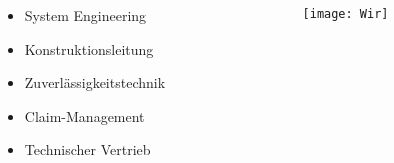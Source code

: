 \documentclass[slidestop,compress,mathserif, aspectratio = 169]{beamer}
\begin{document}
{\begin{columns}[t]
\begin{column}[T]{7cm}
\begin{itemize}
{\begin{itemize}
\begin{itemize}
		\item System Engineering
		\item Konstruktionsleitung
		\item Zuverl\"assigkeitstechnik
		\item Claim-Management
		\item Technischer Vertrieb
		\end{itemize}
		\end{itemize}}
     	\end{itemize}
     \end{column}
     	\begin{column}[T]{7cm} 
         	\begin{center}
			\vspace{-.7cm}
            		\texttt{[image: Wir]}\source{}
        		\end{center}
     \end{column}
 \end{columns}
}




\end{document}
